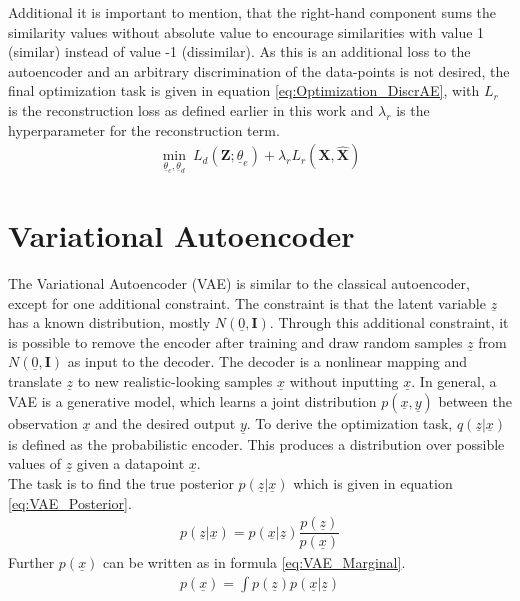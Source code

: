 \documentclass[12pt,DIV14,BCOR12mm,a4paper,footexclude,headinclude,halfparskip-,twoside,openright,cleardoubleempty,idxtotoc,bibtotoc,listtotoc,abstracton]{scrreprt} %
\numberwithin{equation}{chapter}
\begin{document}
Additional it is important to mention, that the right-hand component sums the similarity values without absolute value to encourage similarities with value 1 (similar) instead of value -1 (dissimilar). As this is an additional loss to the autoencoder and an arbitrary discrimination of the data-points is not desired, the final optimization task is given in equation \ref{eq:Optimization_DiscrAE}, with $L_r$ is the reconstruction loss as defined earlier in this work and $\lambda_r$ is the hyperparameter for the reconstruction term.
\begin{align}
	 \underset{\underline{\theta}_e, \underline{\theta}_d}\min\ L_d(\mathbf{Z};\underline{\theta}_e)+\lambda_r L_r(\mathbf{X,\hat{\mathbf{X}}})\label{eq:Optimization_DiscrAE}
\end{align}
\section{Variational Autoencoder}
The Variational Autoencoder (VAE) is similar to the classical autoencoder, except for one additional constraint. The constraint is that the latent variable $\underline{z}$ has a known distribution, mostly $N(\underline{0}, \mathbf{I})$. Through this additional constraint, it is possible to remove the encoder after training and draw random samples $\underline{z}$ from $N(\underline{0}, \mathbf{I})$ as input to the decoder. The decoder is a nonlinear mapping and translate $\underline{z}$ to new realistic-looking samples $\hat{\underline{x}}$ without inputting $\underline{x}$. In general, a VAE is a generative model, which learns a joint distribution $p(\underline{x},\underline{y})$ between the observation $\underline{x}$ and the desired output $\underline{y}$. To derive the optimization task, $q(\underline{z}|\underline{x})$ is defined as the probabilistic encoder. This produces a distribution over possible values of $\underline{z}$ given a datapoint $\underline{x}$.\\
The task is to find the true posterior $p(\underline{z}|\underline{x})$ which is given in equation \ref{eq:VAE_Posterior}.
\begin{align}
	 p(\underline{z}|\underline{x}) = p(\underline{x}|\underline{z})\dfrac{p(\underline{z})}{p(\underline{x})}\label{eq:VAE_Posterior}
\end{align}
Further $p(\underline{x})$ can be written as in formula \ref{eq:VAE_Marginal}.
\begin{align}
	 p(\underline{x}) = \int p(\underline{z})p(\underline{x}|\underline{z})\label{eq:VAE_Marginal}
\end{align}
\end{document}
